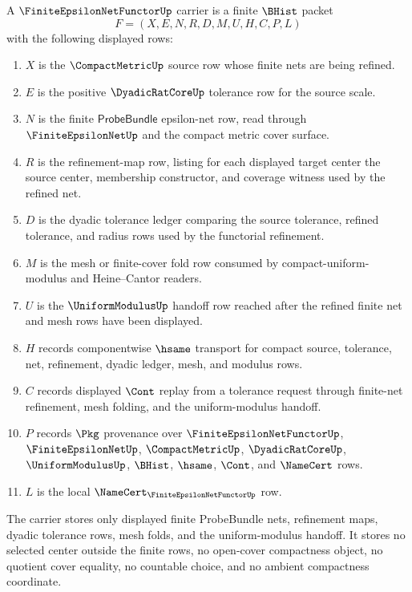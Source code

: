\begin{definition}
\label{def:finite-epsilon-net-functor-carrier}
A $\FiniteEpsilonNetFunctorUp$ carrier is a finite $\BHist$ packet
$$
F=(X,E,N,R,D,M,U,H,C,P,L)
$$
with the following displayed rows:
\begin{enumerate}
\item $X$ is the $\CompactMetricUp$ source row whose finite nets are being refined.
\item $E$ is the positive $\DyadicRatCoreUp$ tolerance row for the source scale.
\item $N$ is the finite $\mathsf{ProbeBundle}$ epsilon-net row, read through $\FiniteEpsilonNetUp$ and the compact metric cover surface.
\item $R$ is the refinement-map row, listing for each displayed target center the source center, membership constructor, and coverage witness used by the refined net.
\item $D$ is the dyadic tolerance ledger comparing the source tolerance, refined tolerance, and radius rows used by the functorial refinement.
\item $M$ is the mesh or finite-cover fold row consumed by compact-uniform-modulus and Heine--Cantor readers.
\item $U$ is the $\UniformModulusUp$ handoff row reached after the refined finite net and mesh rows have been displayed.
\item $H$ records componentwise $\hsame$ transport for compact source, tolerance, net, refinement, dyadic ledger, mesh, and modulus rows.
\item $C$ records displayed $\Cont$ replay from a tolerance request through finite-net refinement, mesh folding, and the uniform-modulus handoff.
\item $P$ records $\Pkg$ provenance over $\FiniteEpsilonNetFunctorUp$, $\FiniteEpsilonNetUp$, $\CompactMetricUp$, $\DyadicRatCoreUp$, $\UniformModulusUp$, $\BHist$, $\hsame$, $\Cont$, and $\NameCert$ rows.
\item $L$ is the local $\NameCert_{\FiniteEpsilonNetFunctorUp}$ row.
\end{enumerate}
The carrier stores only displayed finite ProbeBundle nets, refinement maps, dyadic tolerance rows, mesh folds, and the uniform-modulus handoff. It stores no selected center outside the finite rows, no open-cover compactness object, no quotient cover equality, no countable choice, and no ambient compactness coordinate.
\end{definition}

